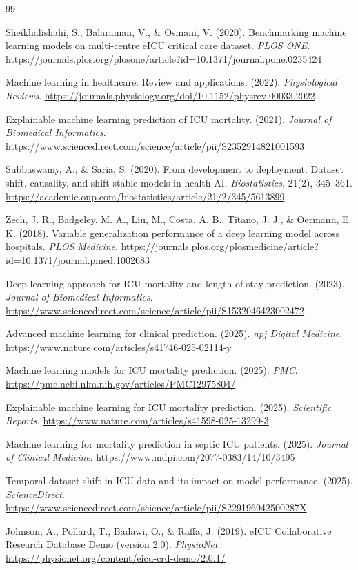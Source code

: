 \documentclass[11pt]{article}
\begin{document}
\begin{thebibliography}{99}

Sheikhalishahi, S., Balaraman, V., \& Osmani, V. (2020).
Benchmarking machine learning models on multi-centre eICU critical care dataset.
\textit{PLOS ONE}.
\url{https://journals.plos.org/plosone/article?id=10.1371/journal.pone.0235424}

Machine learning in healthcare: Review and applications. (2022).
\textit{Physiological Reviews}.
\url{https://journals.physiology.org/doi/10.1152/physrev.00033.2022}

Explainable machine learning prediction of ICU mortality. (2021).
\textit{Journal of Biomedical Informatics}.
\url{https://www.sciencedirect.com/science/article/pii/S2352914821001593}

Subbaswamy, A., \& Saria, S. (2020).
From development to deployment: Dataset shift, causality, and shift-stable models in health AI.
\textit{Biostatistics}, 21(2), 345--361.
\url{https://academic.oup.com/biostatistics/article/21/2/345/5613899}

Zech, J. R., Badgeley, M. A., Liu, M., Costa, A. B., Titano, J. J., \& Oermann, E. K. (2018).
Variable generalization performance of a deep learning model across hospitals.
\textit{PLOS Medicine}.
\url{https://journals.plos.org/plosmedicine/article?id=10.1371/journal.pmed.1002683}

Deep learning approach for ICU mortality and length of stay prediction. (2023).
\textit{Journal of Biomedical Informatics}.
\url{https://www.sciencedirect.com/science/article/pii/S1532046423002472}

Advanced machine learning for clinical prediction. (2025).
\textit{npj Digital Medicine}.
\url{https://www.nature.com/articles/s41746-025-02114-y}

Machine learning models for ICU mortality prediction. (2025).
\textit{PMC}.
\url{https://pmc.ncbi.nlm.nih.gov/articles/PMC12975804/}

Explainable machine learning for ICU mortality prediction. (2025).
\textit{Scientific Reports}.
\url{https://www.nature.com/articles/s41598-025-13299-3}

Machine learning for mortality prediction in septic ICU patients. (2025).
\textit{Journal of Clinical Medicine}.
\url{https://www.mdpi.com/2077-0383/14/10/3495}

Temporal dataset shift in ICU data and its impact on model performance. (2025).
\textit{ScienceDirect}.
\url{https://www.sciencedirect.com/science/article/pii/S229196942500287X}

Johnson, A., Pollard, T., Badawi, O., \& Raffa, J. (2019).
eICU Collaborative Research Database Demo (version 2.0).
\textit{PhysioNet}.
\url{https://physionet.org/content/eicu-crd-demo/2.0.1/}

\end{thebibliography}
\end{document}
